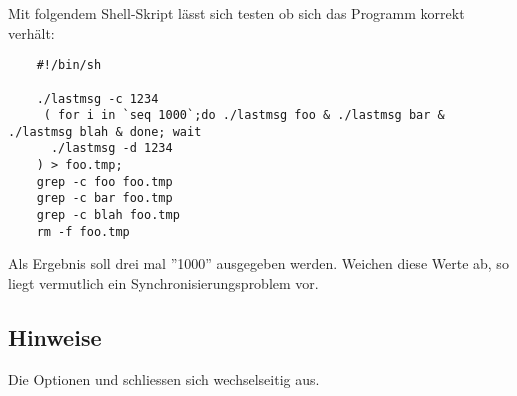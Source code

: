 Mit folgendem Shell-Skript lässt sich testen ob sich das Programm korrekt
verhält:

\begin{verbatim}
	#!/bin/sh

	./lastmsg -c 1234
	 ( for i in `seq 1000`;do ./lastmsg foo & ./lastmsg bar & ./lastmsg blah & done; wait
	  ./lastmsg -d 1234 
	) > foo.tmp;
	grep -c foo foo.tmp
	grep -c bar foo.tmp
	grep -c blah foo.tmp
	rm -f foo.tmp
\end{verbatim}

Als Ergebnis soll drei mal ''1000'' ausgegeben werden. Weichen diese Werte
ab, so liegt vermutlich ein Synchronisierungsproblem vor.

\subsection*{Hinweise}

Die Optionen  und  schliessen sich wechselseitig aus.

\osueguidelinesthree




